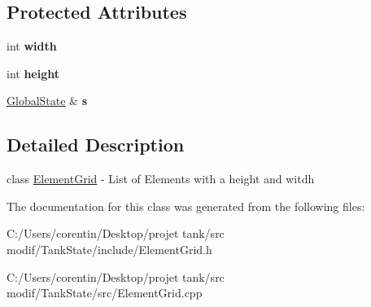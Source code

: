\subsection*{Protected Attributes}
\begin{DoxyCompactItemize}
\item 
\mbox{\label{classstate_1_1_element_grid_acfd12b1d8a3af4bd4f554ed8ca593c51}} 
int {\bfseries width}
\item 
\mbox{\label{classstate_1_1_element_grid_aad232b16857ba8243b2f0e7f833b4c0b}} 
int {\bfseries height}
\item 
\mbox{\label{classstate_1_1_element_grid_a4d8735e4e069609c3898783317c467e7}} 
\hyperlink{classstate_1_1_global_state}{Global\+State} \& {\bfseries s}
\end{DoxyCompactItemize}


\subsection{Detailed Description}
class \hyperlink{classstate_1_1_element_grid}{Element\+Grid} -\/ List of Elements with a height and witdh 

The documentation for this class was generated from the following files\+:\begin{DoxyCompactItemize}
\item 
C\+:/\+Users/corentin/\+Desktop/projet tank/src modif/\+Tank\+State/include/Element\+Grid.\+h\item 
C\+:/\+Users/corentin/\+Desktop/projet tank/src modif/\+Tank\+State/src/Element\+Grid.\+cpp\end{DoxyCompactItemize}
